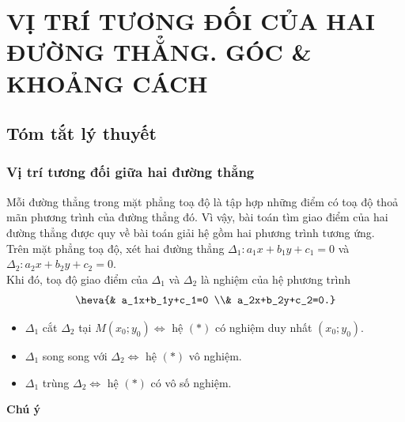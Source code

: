 \newpage\setcounter{dang}{0}
\section{VỊ TRÍ TƯƠNG ĐỐI CỦA HAI ĐƯỜNG THẲNG. GÓC \& KHOẢNG CÁCH}
\subsection{Tóm tắt lý thuyết}
\subsubsection{Vị trí tương đối giữa hai đường thẳng}
Mỗi đường thẳng trong mặt phẳng toạ độ là tập hợp những điểm có toạ độ thoả mãn phương trình của đường thẳng đó. Vì vậy, bài toán tìm giao điểm của hai đường thẳng được quy về bài toán giải hệ gồm hai phương trình tương ứng.\\
Trên mặt phẳng toạ độ, xét hai đường thẳng
$\Delta_1\colon a_1x+b_1y+c_1=0$ và $\Delta_2\colon a_2 x+b_2 y+c_2=0$.\\
Khi đó, toạ độ giao điểm của $\Delta_1$ và $\Delta_2$ là nghiệm của hệ phương trình
$$
\heva{&
	a_1x+b_1y+c_1=0 \\&
	a_2x+b_2y+c_2=0.}$$
\begin{note}
	\begin{itemize}
		\item $\Delta_1$ cắt $\Delta_2$ tại $M(x_0;y_0) \Leftrightarrow$ hệ $(*)$ có nghiệm duy nhất $(x_0; y_0)$.
		\item $\Delta_1$ song song với $\Delta_2 \Leftrightarrow$ hệ $(*)$ vô nghiệm.
		\item $\Delta_1$ trùng $\Delta_2\Leftrightarrow$ hệ $(*)$ có vô số nghiệm.	
	\end{itemize}
\end{note}
{\bf Chú ý}
